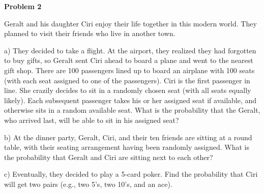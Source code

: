 \documentclass[12pt]{article}
\begin{document}
\begin{flushleft}
\par
\hfill\vspace{0.3in} 
\par 


\newpage
\par
\textbf{Problem 2}
\par
\setlength{\parskip}{1em}
\par
Geralt and his daughter Ciri enjoy their life together in this modern world. They planned to visit their friends who live in another town.
\par
a) They decided to take a flight. At the airport, they realized they had forgotten to buy gifts, so Geralt sent Ciri ahead to board a plane and went to the nearest gift shop. There are 100 passengers lined up to board an airplane with 100 seats (with each seat assigned to one of the passengers). Ciri is the first passenger in line. She crazily decides to sit in a randomly chosen seat (with all seats equally likely). Each subsequent passenger takes his or her assigned seat if available, and otherwise sits in a random available seat. What is the probability that the Geralt, who arrived last, will be able to sit in his assigned seat? 
\par
\hfill\vspace{0.5in} 
\par
b) At the dinner party, Geralt, Ciri, and their ten friends are sitting at a round table, with their seating arrangement having been randomly assigned. What is the probability that Geralt and Ciri are sitting next to each other?
\par
\hfill\vspace{0.5in} 
\par
c) Eventually, they decided to play a 5-card poker. Find the probability that Ciri will get two pairs (e.g., two 5's, two 10's, and an ace).
\par
\hfill\vspace{0.5in} 
\par


\end{flushleft}
\end{document}
